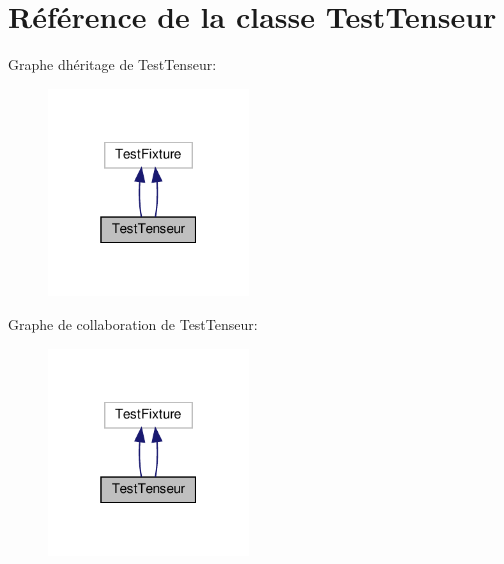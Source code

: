 \hypertarget{classTestTenseur}{}\section{Référence de la classe Test\+Tenseur}
\label{classTestTenseur}


Graphe d\textquotesingle{}héritage de Test\+Tenseur\+:
\nopagebreak
\begin{figure}[H]
\begin{center}
\leavevmode
\includegraphics[width=151pt]{classTestTenseur__inherit__graph}
\end{center}
\end{figure}


Graphe de collaboration de Test\+Tenseur\+:
\nopagebreak
\begin{figure}[H]
\begin{center}
\leavevmode
\includegraphics[width=151pt]{classTestTenseur__coll__graph}
\end{center}
\end{figure}
